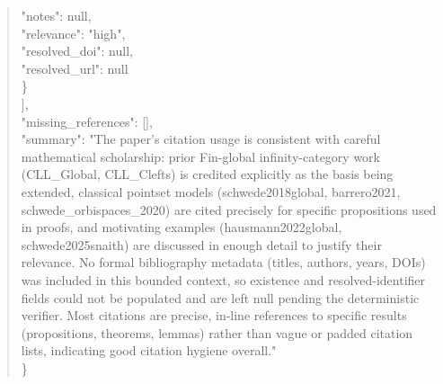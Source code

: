 \documentclass[11pt]{article}
\begin{document}
\begin{quote}
      "notes": null,\\
      "relevance": "high",\\
      "resolved\_doi": null,\\
      "resolved\_url": null\\
    \}\\
  ],\\
  "missing\_references": [],\\
  "summary": "The paper's citation usage is consistent with careful mathematical scholarship: prior Fin-global infinity-category work (CLL\_Global, CLL\_Clefts) is credited explicitly as the basis being extended, classical pointset models (schwede2018global, barrero2021, schwede\_orbispaces\_2020) are cited precisely for specific propositions used in proofs, and motivating examples (hausmann2022global, schwede2025snaith) are discussed in enough detail to justify their relevance. No formal bibliography metadata (titles, authors, years, DOIs) was included in this bounded context, so existence and resolved-identifier fields could not be populated and are left null pending the deterministic verifier. Most citations are precise, in-line references to specific results (propositions, theorems, lemmas) rather than vague or padded citation lists, indicating good citation hygiene overall."\\
\}\\
\end{quote}
\end{document}
